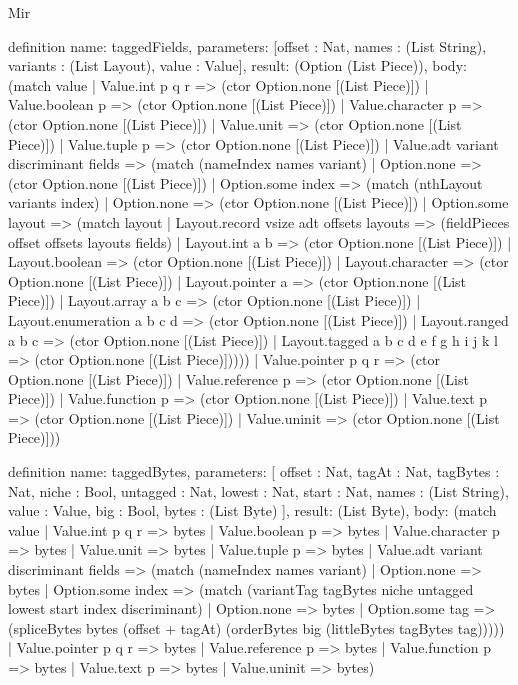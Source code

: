 \begin{lexlean}{Mir}
\begin{semanticmodule}
definition{
  name: taggedFields,
  parameters: [offset : Nat, names : (List String), variants : (List Layout), value : Value],
  result: (Option (List Piece)),
  body: (match value
    | Value.int p q r => (ctor Option.none [(List Piece)])
    | Value.boolean p => (ctor Option.none [(List Piece)])
    | Value.character p => (ctor Option.none [(List Piece)])
    | Value.unit => (ctor Option.none [(List Piece)])
    | Value.tuple p => (ctor Option.none [(List Piece)])
    | Value.adt variant discriminant fields => (match (nameIndex names variant)
      | Option.none => (ctor Option.none [(List Piece)])
      | Option.some index => (match (nthLayout variants index)
        | Option.none => (ctor Option.none [(List Piece)])
        | Option.some layout => (match layout
          | Layout.record vsize adt offsets layouts => (fieldPieces offset offsets layouts fields)
          | Layout.int a b => (ctor Option.none [(List Piece)])
          | Layout.boolean => (ctor Option.none [(List Piece)])
          | Layout.character => (ctor Option.none [(List Piece)])
          | Layout.pointer a => (ctor Option.none [(List Piece)])
          | Layout.array a b c => (ctor Option.none [(List Piece)])
          | Layout.enumeration a b c d => (ctor Option.none [(List Piece)])
          | Layout.ranged a b c => (ctor Option.none [(List Piece)])
          | Layout.tagged a b c d e f g h i j k l => (ctor Option.none [(List Piece)]))))
    | Value.pointer p q r => (ctor Option.none [(List Piece)])
    | Value.reference p => (ctor Option.none [(List Piece)])
    | Value.function p => (ctor Option.none [(List Piece)])
    | Value.text p => (ctor Option.none [(List Piece)])
    | Value.uninit => (ctor Option.none [(List Piece)]))
}

definition{
  name: taggedBytes,
  parameters: [
    offset : Nat,
    tagAt : Nat,
    tagBytes : Nat,
    niche : Bool,
    untagged : Nat,
    lowest : Nat,
    start : Nat,
    names : (List String),
    value : Value,
    big : Bool,
    bytes : (List Byte)
  ],
  result: (List Byte),
  body: (match value
    | Value.int p q r => bytes
    | Value.boolean p => bytes
    | Value.character p => bytes
    | Value.unit => bytes
    | Value.tuple p => bytes
    | Value.adt variant discriminant fields => (match (nameIndex names variant)
      | Option.none => bytes
      | Option.some index => (match (variantTag tagBytes niche untagged lowest start index discriminant)
        | Option.none => bytes
        | Option.some tag => (spliceBytes bytes (offset + tagAt) (orderBytes big (littleBytes tagBytes tag)))))
    | Value.pointer p q r => bytes
    | Value.reference p => bytes
    | Value.function p => bytes
    | Value.text p => bytes
    | Value.uninit => bytes)
}


\end{semanticmodule}
\end{lexlean}
